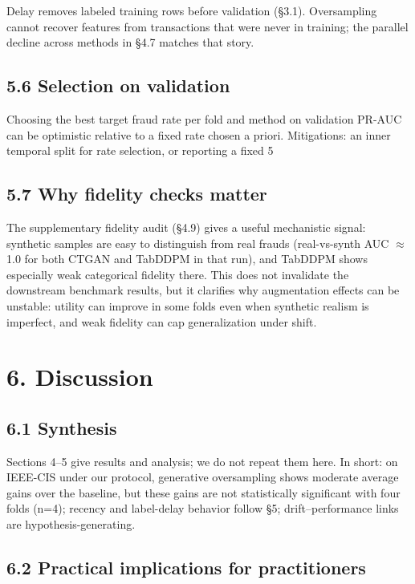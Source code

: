 \documentclass[sigconf]{acmart}
\begin{document}
{{{{{{{{Delay removes labeled training rows before validation (§3.1). Oversampling cannot recover features from transactions that were never in training; the parallel decline across methods in §4.7 matches that story.

\subsection{5.6 Selection on validation}

Choosing the best target fraud rate per fold and method on validation PR-AUC can be optimistic relative to a fixed rate chosen a priori. Mitigations: an inner temporal split for rate selection, or reporting a fixed 5%

\subsection{5.7 Why fidelity checks matter}

The supplementary fidelity audit (§4.9) gives a useful mechanistic signal: synthetic samples are easy to distinguish from real frauds (real-vs-synth AUC \(\approx\) 1.0 for both CTGAN and TabDDPM in that run), and TabDDPM shows especially weak categorical fidelity there. This does not invalidate the downstream benchmark results, but it clarifies why augmentation effects can be unstable: utility can improve in some folds even when synthetic realism is imperfect, and weak fidelity can cap generalization under shift.


\section{6. Discussion}

\subsection{6.1 Synthesis}

Sections 4--5 give results and analysis; we do not repeat them here. In short: on IEEE-CIS under our protocol, generative oversampling shows moderate average gains over the baseline, but these gains are not statistically significant with four folds (n=4); recency and label-delay behavior follow §5; drift--performance links are hypothesis-generating.

\subsection{6.2 Practical implications for practitioners}

}}}}}}}}
\end{document}
